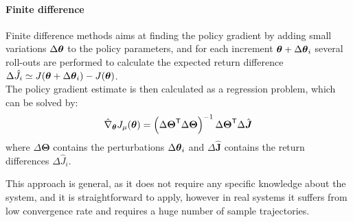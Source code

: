 \paragraph{Finite difference}
Finite difference methods aims at finding the policy gradient by adding small variations $\Delta{\boldsymbol{\theta}}$ to the policy parameters, and for each increment ${\boldsymbol{\theta}} + \Delta{\boldsymbol{\theta}}_i$ several roll-outs are performed to calculate the expected return difference $\Delta\hat{J}_i \simeq J({\boldsymbol{\theta}} + \Delta{\boldsymbol{\theta}}_i) - J({\boldsymbol{\theta}})$.\\
The policy gradient estimate is then calculated as a regression problem, which can be solved by:
\[
\hat{\nabla}_{{\boldsymbol{\theta}}}J_\mu({\boldsymbol{\theta}}) = \left({\Delta\boldsymbol{\Theta}}^{\mathsf{T}}\Delta\boldsymbol{\Theta}\right)^{-1}{\Delta\boldsymbol{\Theta}}^{\mathsf{T}}\Delta\hat{\boldsymbol{J}}
\]
where $\Delta\boldsymbol{\Theta}$ contains the perturbations $\Delta{\boldsymbol{\theta}}_i$ and $\Delta\hat{\boldsymbol{J}}$ contains the return differences $\Delta\hat{J}_i$.

This approach is general, as it does not require any specific knowledge about the system, and it is straightforward to apply, however in real systems it suffers from low convergence rate and requires a huge number of sample trajectories.

